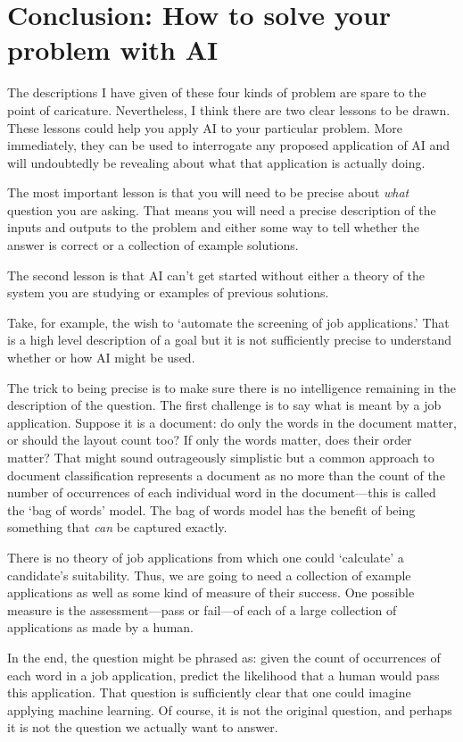 \documentclass[10pt, a4paper, twocolumn]{article}
\begin{document}
\section{Conclusion: How to solve your problem with AI}

The descriptions I have given of these four kinds of problem are spare to the
point of caricature. Nevertheless, I think there are two clear lessons to be
drawn. These lessons could help you apply AI to your particular problem. More
immediately, they can be used to interrogate any proposed application of AI and
will undoubtedly be revealing about what that application is actually doing.

The most important lesson is that you will need to be precise about \emph{what}
question you are asking. That means you will need a precise description of the
inputs and outputs to the problem and either some way to tell whether the answer
is correct or a collection of example solutions. 

The second lesson is that AI can't get started without either a theory of the
system you are studying or examples of previous solutions.

Take, for example, the wish to `automate the screening of job applications.'
That is a high level description of a goal but it is not sufficiently precise to
understand whether or how AI might be used.

The trick to being precise is to make sure there is no intelligence remaining in
the description of the question. The first challenge is to say what is meant by
a job application. Suppose it is a document: do only the words in the document
matter, or should the layout count too? If only the words matter, does their
order matter? That might sound outrageously simplistic but a common approach to
document classification represents a document as no more than the count of the
number of occurrences of each individual word in the document---this is called the
`bag of words' model. The bag of words model has the benefit of being something
that \emph{can} be captured exactly.

There is no theory of job applications from which one could `calculate' a
candidate's suitability. Thus, we are going to need a collection of example
applications as well as some kind of measure of their success. One possible
measure is the assessment---pass or fail---of each of a large collection of
applications as made by a human.

In the end, the question might be phrased as: given the count of occurrences of
each word in a job application, predict the likelihood that a human would pass
this application. That question is sufficiently clear that one could imagine
applying machine learning. Of course, it is not the original question, and
perhaps it is not the question we actually want to answer.
\end{document}
